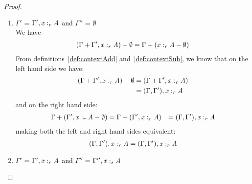\begin{proof}
\begin{enumerate}
    \item $\Gamma'$ = $\Gamma'  \GRANULEsym{,}   \GRANULEmv{x}  :_{\textcolor{coeffectColor}{  \GRANULEnt{r}  } }   \GRANULEnt{A}$ and $\Gamma''$ = $\emptyset$\\
      We have
      \begin{align*}
        (\Gamma + \Gamma'  \GRANULEsym{,}   \GRANULEmv{x}  :_{\textcolor{coeffectColor}{  \GRANULEnt{r}  } }   \GRANULEnt{A}) - \emptyset = \Gamma + (\GRANULEmv{x}  :_{\textcolor{coeffectColor}{  \GRANULEnt{r}  } }   \GRANULEnt{A} - \emptyset)
      \end{align*}
      From definitions~\ref{def:contextAdd} and~\ref{def:contextSub}, we know that
      on the left hand side we have:
      \begin{align*}
        (\Gamma + \Gamma'  \GRANULEsym{,}   \GRANULEmv{x}  :_{\textcolor{coeffectColor}{  \GRANULEnt{r}  } }   \GRANULEnt{A}) - \emptyset &= (\Gamma + \Gamma'  \GRANULEsym{,}   \GRANULEmv{x}  :_{\textcolor{coeffectColor}{  \GRANULEnt{r}  } }   \GRANULEnt{A}) \\
                                            &= (\Gamma, \Gamma'), \GRANULEmv{x}  :_{\textcolor{coeffectColor}{  \GRANULEnt{r}  } }   \GRANULEnt{A}
      \end{align*}
      and on the right hand side:
      \begin{align*}
        \Gamma + (\Gamma'  \GRANULEsym{,}   \GRANULEmv{x}  :_{\textcolor{coeffectColor}{  \GRANULEnt{r}  } }   \GRANULEnt{A} - \emptyset) &= \Gamma + (\Gamma'  \GRANULEsym{,}   \GRANULEmv{x}  :_{\textcolor{coeffectColor}{  \GRANULEnt{r}  } }   \GRANULEnt{A})
                                            &= (\Gamma,\Gamma'),\GRANULEmv{x}  :_{\textcolor{coeffectColor}{  \GRANULEnt{r}  } }   \GRANULEnt{A}
      \end{align*}
      making both the left and right hand sides equivalent:
      \begin{align*}
        (\Gamma,\Gamma'),\GRANULEmv{x}  :_{\textcolor{coeffectColor}{  \GRANULEnt{r}  } }   \GRANULEnt{A} = (\Gamma,\Gamma'),\GRANULEmv{x}  :_{\textcolor{coeffectColor}{  \GRANULEnt{r}  } }   \GRANULEnt{A}
      \end{align*}


    \item $\Gamma'$ = $\Gamma'  \GRANULEsym{,}   \GRANULEmv{x}  :_{\textcolor{coeffectColor}{  \GRANULEnt{r}  } }   \GRANULEnt{A}$ and $\Gamma''$ = $\Gamma''  \GRANULEsym{,}   \GRANULEmv{x}  :_{\textcolor{coeffectColor}{  \GRANULEnt{s}  } }   \GRANULEnt{A}$\\


\end{enumerate}
\end{proof}
